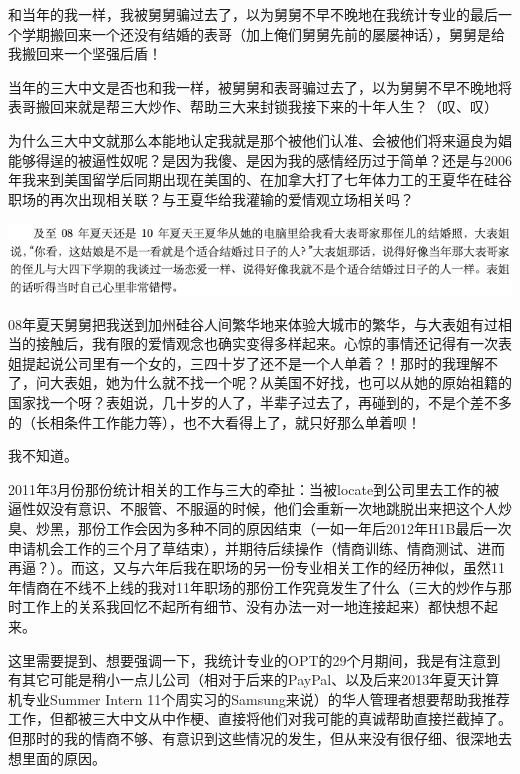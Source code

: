 \documentclass[9pt, b5paper]{article}
\begin{document}
和当年的我一样，我被舅舅骗过去了，以为舅舅不早不晚地在我统计专业的最后一个学期搬回来一个还没有结婚的表哥（加上俺们舅舅先前的屡屡神话），舅舅是给我搬回来一个坚强后盾！

当年的三大中文是否也和我一样，被舅舅和表哥骗过去了，以为舅舅不早不晚地将表哥搬回来就是帮三大炒作、帮助三大来封锁我接下来的十年人生？（叹、叹）

为什么三大中文就那么本能地认定我就是那个被他们认准、会被他们将来逼良为娼能够得逞的被逼性奴呢？是因为我傻、是因为我的感情经历过于简单？还是与2006年我来到美国留学后同期出现在美国的、在加拿大打了七年体力工的王夏华在硅谷职场的再次出现相关联？与王夏华给我灌输的爱情观立场相关吗？

\begin{center}
\includegraphics[width=.9\linewidth]{./pic/pfp53.png}
\end{center}

08年夏天舅舅把我送到加州硅谷人间繁华地来体验大城市的繁华，与大表姐有过相当的接触后，我有限的爱情观念也确实变得多样起来。心惊的事情还记得有一次表姐提起说公司里有一个女的，三四十岁了还不是一个人单着？！那时的我理解不了，问大表姐，她为什么就不找一个呢？从美国不好找，也可以从她的原始祖籍的国家找一个呀？表姐说，几十岁的人了，半辈子过去了，再碰到的，不是个差不多的（长相条件工作能力等），也不大看得上了，就只好那么单着呗！

我不知道。

2011年3月份那份统计相关的工作与三大的牵扯：当被locate到公司里去工作的被逼性奴没有意识、不服管、不服逼的时候，他们会重新一次地跳脱出来把这个人炒臭、炒黑，那份工作会因为多种不同的原因结束（一如一年后2012年H1B最后一次申请机会工作的三个月了草结束），并期待后续操作（情商训练、情商测试、进而再逼？）。而这，又与六年后我在职场的另一份专业相关工作的经历神似，虽然11年情商在不线不上线的我对11年职场的那份工作究竟发生了什么（三大的炒作与那时工作上的关系我回忆不起所有细节、没有办法一对一地连接起来）都快想不起来。 

这里需要提到、想要强调一下，我统计专业的OPT的29个月期间，我是有注意到有其它可能是稍小一点儿公司（相对于后来的PayPal、以及后来2013年夏天计算机专业Summer Intern 11个周实习的Samsung来说）的华人管理者想要帮助我推荐工作，但都被三大中文从中作梗、直接将他们对我可能的真诚帮助直接拦截掉了。但那时的我的情商不够、有意识到这些情况的发生，但从来没有很仔细、很深地去想里面的原因。 
\end{document}
